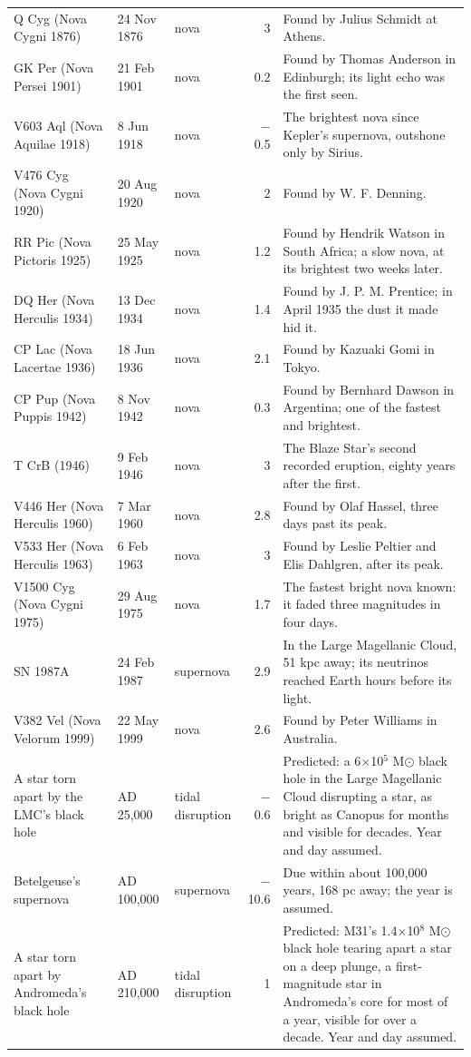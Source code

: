 \documentclass[9pt,twocolumn]{extarticle}
\begin{document}
\begin{table}[tp]
\begin{tabularx}{\textwidth}{@{}p{3.6cm}p{1.6cm}lrY@{}}
Q Cyg (Nova Cygni 1876) & 24 Nov 1876 & nova & 3 & Found by Julius Schmidt at Athens. \\
GK Per (Nova Persei 1901) & 21 Feb 1901 & nova & 0.2 & Found by Thomas Anderson in Edinburgh; its light echo was the first seen. \\
V603 Aql (Nova Aquilae 1918) & 8 Jun 1918 & nova & $-$0.5 & The brightest nova since Kepler's supernova, outshone only by Sirius. \\
V476 Cyg (Nova Cygni 1920) & 20 Aug 1920 & nova & 2 & Found by W. F. Denning. \\
RR Pic (Nova Pictoris 1925) & 25 May 1925 & nova & 1.2 & Found by Hendrik Watson in South Africa; a slow nova, at its brightest two weeks later. \\
DQ Her (Nova Herculis 1934) & 13 Dec 1934 & nova & 1.4 & Found by J. P. M. Prentice; in April 1935 the dust it made hid it. \\
CP Lac (Nova Lacertae 1936) & 18 Jun 1936 & nova & 2.1 & Found by Kazuaki Gomi in Tokyo. \\
CP Pup (Nova Puppis 1942) & 8 Nov 1942 & nova & 0.3 & Found by Bernhard Dawson in Argentina; one of the fastest and brightest. \\
T CrB (1946) & 9 Feb 1946 & nova & 3 & The Blaze Star's second recorded eruption, eighty years after the first. \\
V446 Her (Nova Herculis 1960) & 7 Mar 1960 & nova & 2.8 & Found by Olaf Hassel, three days past its peak. \\
V533 Her (Nova Herculis 1963) & 6 Feb 1963 & nova & 3 & Found by Leslie Peltier and Elis Dahlgren, after its peak. \\
V1500 Cyg (Nova Cygni 1975) & 29 Aug 1975 & nova & 1.7 & The fastest bright nova known: it faded three magnitudes in four days. \\
SN 1987A & 24 Feb 1987 & supernova & 2.9 & In the Large Magellanic Cloud, 51 kpc away; its neutrinos reached Earth hours before its light. \\
V382 Vel (Nova Velorum 1999) & 22 May 1999 & nova & 2.6 & Found by Peter Williams in Australia. \\
A star torn apart by the LMC's black hole & AD 25,000 & tidal disruption & $-$0.6 & Predicted: a 6$\times$10$^{5}$ M$\odot$ black hole in the Large Magellanic Cloud disrupting a star, as bright as Canopus for months and visible for decades. Year and day assumed. \\
Betelgeuse's supernova & AD 100,000 & supernova & $-$10.6 & Due within about 100,000 years, 168 pc away; the year is assumed. \\
A star torn apart by Andromeda's black hole & AD 210,000 & tidal disruption & 1 & Predicted: M31's 1.4$\times$10$^{8}$ M$\odot$ black hole tearing apart a star on a deep plunge, a first-magnitude star in Andromeda's core for most of a year, visible for over a decade. Year and day assumed. \\
\bottomrule\end{tabularx}
\end{table}
\end{document}
